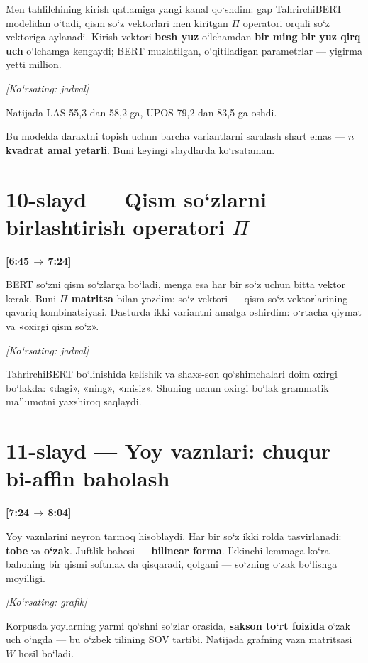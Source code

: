 \documentclass[14pt,a4paper]{extarticle}
\let\origsection\section
\renewcommand{\section}{\Needspace*{9\baselineskip}\origsection}
\newcommand{\timing}[2]{%
   \par\nobreak\noindent\textbf{[#1\,$\to$\,#2]}\par\vspace{0.3em}}
\newcommand{\say}[1]{\textbf{#1}}
\newcommand{\pointto}[1]{\par\vspace{0.3em}\noindent\textit{\small
   [Ko‘rsating: #1]}\par}
\begin{document}
Men tahlilchining kirish qatlamiga yangi kanal qo‘shdim: gap TahrirchiBERT
modelidan o‘tadi, qism so‘z vektorlari men kiritgan $\Pi$ operatori orqali so‘z
vektoriga aylanadi. Kirish vektori \textbf{besh yuz} o‘lchamdan \textbf{bir ming bir
yuz qirq uch} o‘lchamga kengaydi; BERT muzlatilgan, o‘qitiladigan parametrlar ---
yigirma yetti million.

\pointto{jadval}

Natijada LAS 55,3 dan 58,2 ga, UPOS 79,2 dan 83,5 ga oshdi.

Bu modelda daraxtni topish uchun barcha variantlarni saralash shart emas ---
\say{$n$ kvadrat amal yetarli}. Buni keyingi slaydlarda ko‘rsataman.

\section*{10-slayd --- Qism so‘zlarni birlashtirish operatori $\Pi$}
\timing{6:45}{7:24}

BERT so‘zni qism so‘zlarga bo‘ladi, menga esa har bir so‘z uchun bitta vektor
kerak. Buni \textbf{$\Pi$ matritsa} bilan yozdim: so‘z vektori --- qism so‘z
vektorlarining qavariq kombinatsiyasi. Dasturda ikki variantni amalga oshirdim:
o‘rtacha qiymat va «oxirgi qism so‘z».

\pointto{jadval}

TahrirchiBERT bo‘linishida kelishik va shaxs-son qo‘shimchalari doim oxirgi bo‘lakda:
«dagi», «ning», «misiz». Shuning uchun oxirgi bo‘lak grammatik ma’lumotni
yaxshiroq saqlaydi.

\section*{11-slayd --- Yoy vaznlari: chuqur bi-affin baholash}
\timing{7:24}{8:04}

Yoy vaznlarini neyron tarmoq hisoblaydi. Har bir so‘z ikki rolda tasvirlanadi:
\textbf{tobe} va \textbf{o‘zak}. Juftlik bahosi --- \textbf{bilinear forma}. Ikkinchi
lemmaga ko‘ra bahoning bir qismi softmax da qisqaradi, qolgani --- so‘zning o‘zak
bo‘lishga moyilligi.

\pointto{grafik}

Korpusda yoylarning yarmi qo‘shni so‘zlar orasida, \textbf{sakson to‘rt foizida}
o‘zak uch o‘ngda --- bu o‘zbek tilining SOV tartibi. Natijada grafning vazn
matritsasi $W$ hosil bo‘ladi.
\end{document}
